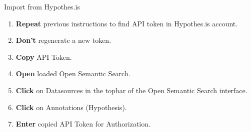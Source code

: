 \documentclass[10pt,a4paper]{article}
\begin{document}
\begin{textbox}{Import from Hypothes.is}

  

\begin{enumerate}
\item \textbf{Repeat} previous instructions to find API token in Hypothes.is account. 
\item \textbf{Don't} regenerate a new token.
\item \textbf{Copy} API Token.
\item \textbf{Open} loaded Open Semantic Search.
\item \textbf{Click} on Datasources in the topbar of the Open Semantic Search interface.
\item \textbf{Click} on Annotations (Hypothesis).
\item \textbf{Enter} copied API Token for Authorization.
\end{enumerate}


\end{textbox}
\end{document}
